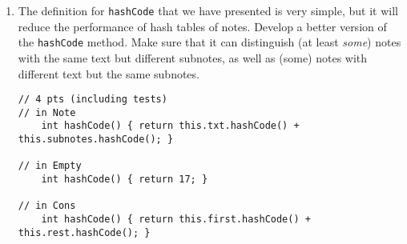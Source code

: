 \documentclass[12pt]{article}                   %
\newenvironment{solution}{\color{Red}}{}
\begin{document}
\begin{problem}
\begin{enumerate}
\newpage

\noindent
\item The definition for \texttt{hashCode} that we have presented is
  very simple, but it will reduce the performance of hash tables of
  notes.  Develop a better version of the \texttt{hashCode} method.
  Make sure that it can distinguish (at least \emph{some}) notes with
  the same text but different subnotes, as well as (some)
  notes with different text but the same subnotes.

\ifrubric
\else
{}
\fi

\begin{solution}
\begin{verbatim}
// 4 pts (including tests)
// in Note
    int hashCode() { return this.txt.hashCode() + this.subnotes.hashCode(); }

// in Empty
    int hashCode() { return 17; }

// in Cons
    int hashCode() { return this.first.hashCode() + this.rest.hashCode(); }
\end{verbatim}
\end{solution}

\newpage
\newpage
\end{enumerate}
\end{problem}


\end{document}
